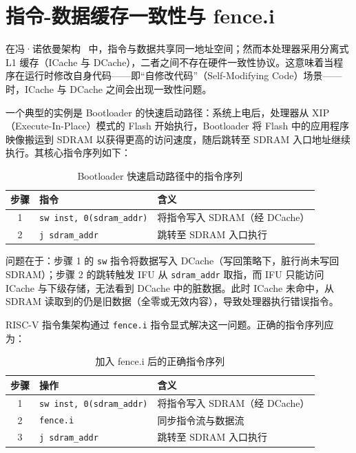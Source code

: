 \section{指令-数据缓存一致性与 fence.i}

在冯·诺依曼架构~\cite{vonneumann1945edvac} 中，指令与数据共享同一地址空间；然而本处理器采用分离式 L1 缓存（ICache 与 DCache），二者之间不存在硬件一致性协议。这意味着当程序在运行时修改自身代码——即“自修改代码”（Self-Modifying Code）场景——时，ICache 与 DCache 之间会出现一致性问题。

一个典型的实例是 Bootloader 的快速启动路径：系统上电后，处理器从 XIP（Execute-In-Place）模式的 Flash 开始执行，Bootloader 将 Flash 中的应用程序映像搬运到 SDRAM 以获得更高的访问速度，随后跳转至 SDRAM 入口地址继续执行。其核心指令序列如下：

\begin{table}[H]
  \centering
  \caption{Bootloader 快速启动路径中的指令序列}
  \label{tbl:bootloader-seq}
  \begin{tabular}{cll}
    \toprule
    步骤 & 指令 & 含义 \\
    \midrule
    1 & \lstinline|sw inst, 0(sdram_addr)| & 将指令写入 SDRAM（经 DCache） \\
    2 & \lstinline|j sdram_addr| & 跳转至 SDRAM 入口执行 \\
    \bottomrule
  \end{tabular}
\end{table}

问题在于：步骤 1 的 \lstinline|sw| 指令将数据写入 DCache（写回策略下，脏行尚未写回 SDRAM）；步骤 2 的跳转触发 IFU 从 \lstinline|sdram_addr| 取指，而 IFU 只能访问 ICache 与下级存储，无法看到 DCache 中的脏数据。此时 ICache 未命中，从 SDRAM 读取到的仍是旧数据（全零或无效内容），导致处理器执行错误指令。

RISC-V 指令集架构通过 \lstinline|fence.i| 指令显式解决这一问题。正确的指令序列应为：

\begin{table}[H]
  \centering
  \caption{加入 fence.i 后的正确指令序列}
  \label{tbl:bootloader-fence}
  \begin{tabular}{cll}
    \toprule
    步骤 & 操作 & 含义 \\
    \midrule
    1 & \lstinline|sw inst, 0(sdram_addr)| & 将指令写入 SDRAM（经 DCache） \\
    2 & \lstinline|fence.i| & 同步指令流与数据流 \\
    3 & \lstinline|j sdram_addr| & 跳转至 SDRAM 入口执行 \\
    \bottomrule
  \end{tabular}
\end{table}

